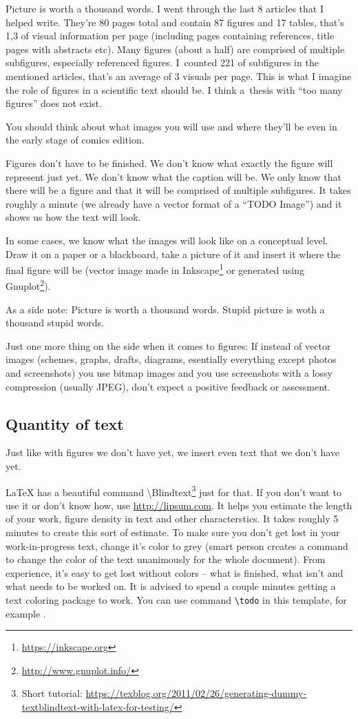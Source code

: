 Picture is worth a thousand words. I went through the last 8 articles that I helped write. They're 80 pages total and contain 87 figures and 17 tables, that's 1,3 of visual information per page (including pages containing references, title pages with abstracts etc). Many figures (about a half) are comprised of multiple subfigures, especially referenced figures. I~counted 221 of subfigures in the mentioned articles, that's an average of 3 visuals per page. This is what I imagine the role of figures in a scientific text should be. I think a~thesis with ``too many figures'' does not exist.

You should think about what images you will use and where they'll be even in the early stage of comics edition.

Figures don't have to be finished. We don't know what exactly the figure will represent just yet. We don't know what the caption will be. We only know that there will be a figure and that it will be comprised of multiple subfigures. It takes roughly a minute (we already have a vector format of a ``TODO Image'') and it shows us how the text will look.

In some cases, we know what the images will look like on a conceptual level. Draw it on a paper or a blackboard, take a picture of it and insert it where the final figure will be (vector image made in Inkscape\footnote{\url{https://inkscape.org}} or generated using Gnuplot\footnote{\url{http://www.gnuplot.info/}}). 

As a side note: Picture is worth a thousand words. Stupid picture is woth a thousand stupid words.

Just one more thing on the side when it comes to figures: If instead of vector images (schemes, graphs, drafts, diagrams, esentially everything except photos and screenshots) you use bitmap images and you use screenshots with a lossy compression (usually JPEG), don't expect a positive feedback or assessment.

\subsection*{Quantity of text}

Just like with figures we don't have yet, we insert even text that we don't have yet.

LaTeX has a beautiful command \textbackslash Blindtext\footnote{Short tutorial: \url{https://texblog.org/2011/02/26/generating-dummy-textblindtext-with-latex-for-testing/}} just for that. If you don't want to use it or don't know how, use \url{http://lipsum.com}. It helps you estimate the length of your work, figure density in text and other characterstics. It takes roughly 5 minutes to create this sort of estimate. To make sure you don't get lost in your work-in-progress text, change it's color to grey (smart person creates a command to change the color of the text unanimously for the whole document). From experience, it's easy to get lost without colors -- what is finished, what isn't and what needs to be worked on. It is advised to spend a couple minutes getting a text coloring package to work. You can use command \verb|\todo| in this template, for example .

